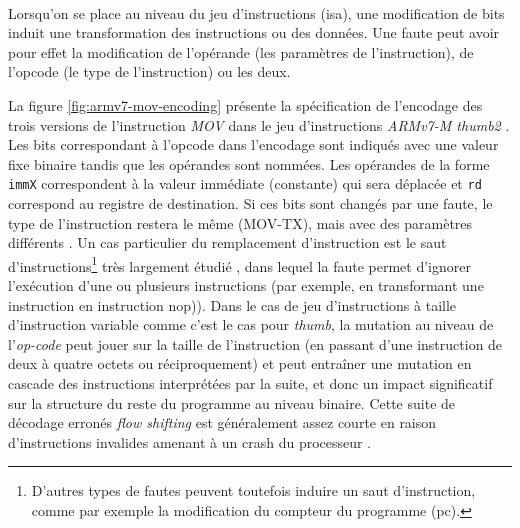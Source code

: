                 \paragraph{}
                Lorsqu'on se place au niveau du jeu d'instructions (\gls{isa}), une modification de bits induit une transformation des instructions ou des données.
                Une faute peut avoir pour effet la modification de l'opérande (les paramètres de l'instruction), de l'opcode (le type de l'instruction) ou les deux.
                
                La figure \ref{fig:armv7-mov-encoding} présente la spécification de l'encodage des trois versions de l'instruction \textit{MOV} dans le jeu d'instructions \textit{ARMv7-M thumb2} \cite{ARMv7/manual}. 
                Les bits correspondant à l'opcode dans l'encodage sont indiqués avec une valeur fixe binaire tandis que les opérandes sont nommées. Les opérandes de la forme \texttt{immX} correspondent à la valeur immédiate (constante) qui sera déplacée et \texttt{rd} correspond au registre de destination. Si ces bits sont changés par une faute, le type de l'instruction restera le même (MOV-TX), mais avec des paramètres différents \cite{Colombier/HOST19}.
                Un cas particulier du remplacement d'instruction est le saut d'instructions\footnote{D'autres types de fautes peuvent toutefois induire un saut d'instruction, comme par exemple la modification du compteur du programme (\gls{pc}).} très largement étudié \cite{Balasch/FDTC11, Kelly/HOST17, Moro/FDTC13}, dans lequel la faute permet d'ignorer l'exécution d'une ou plusieurs instructions (par exemple, en transformant une instruction en instruction \gls{nop})).
                Dans le cas de jeu d'instructions à taille d'instruction variable comme c'est le cas pour \textit{thumb}, la mutation au niveau de l'\textit{op-code} peut jouer sur la taille de l'instruction (en passant d'une instruction de deux à quatre octets ou réciproquement) et peut entraîner une mutation en cascade des instructions interprétées par la suite, et donc un impact significatif sur la structure du reste du programme au niveau binaire. Cette suite de décodage erronés \textit{flow shifting} \cite{Berthome/ARES12} est généralement assez courte en raison d'instructions invalides amenant à un crash du processeur \cite{Shacham/CCS07}.
                
